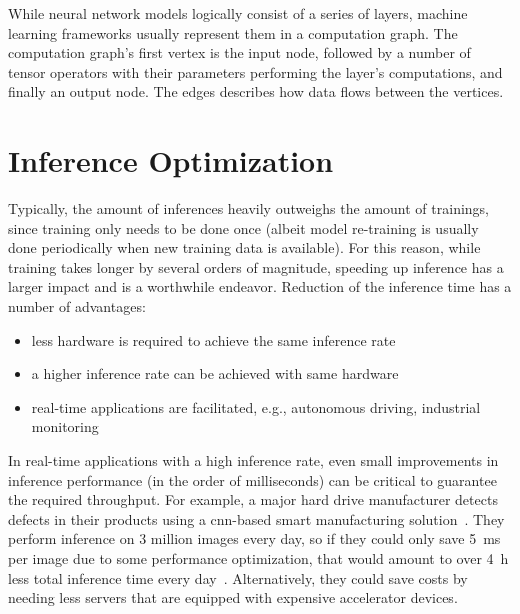 While neural network models logically consist of a series of layers, machine learning frameworks usually represent them in a computation graph. The computation graph's first vertex is the input node, followed by a number of tensor operators with their parameters performing the layer's computations, and finally an output node. The edges describes how data flows between the vertices.

\section{Inference Optimization}
Typically, the amount of inferences heavily outweighs the amount of trainings, since training only needs to be done once (albeit model re-training is usually done periodically when new training data is available). For this reason, while training takes longer by several orders of magnitude, speeding up inference has a larger impact and is a worthwhile endeavor. 
Reduction of the inference time has a number of advantages:
\begin{itemize}
	\item less hardware is required to achieve the same inference rate
	\item a higher inference rate can be achieved with same hardware
	\item real-time applications are facilitated, e.g., autonomous driving, industrial monitoring
\end{itemize}
In real-time applications with a high inference rate, even small improvements in inference performance (in the order of milliseconds) can be critical to guarantee the required throughput.
For example, a major hard drive manufacturer detects defects in their products using a \gls{cnn}-based smart manufacturing solution~\cite[p.~11]{LyveDataLabs.2019}. They perform inference on 3 million images every day, so if they could only save \SI{5}{\milli\second} per image due to some performance optimization, that would amount to over \SI{4}{\hour} less total inference time every day~\cite{Seagate.2019}. Alternatively, they could save costs by needing less servers that are equipped with expensive accelerator devices.

